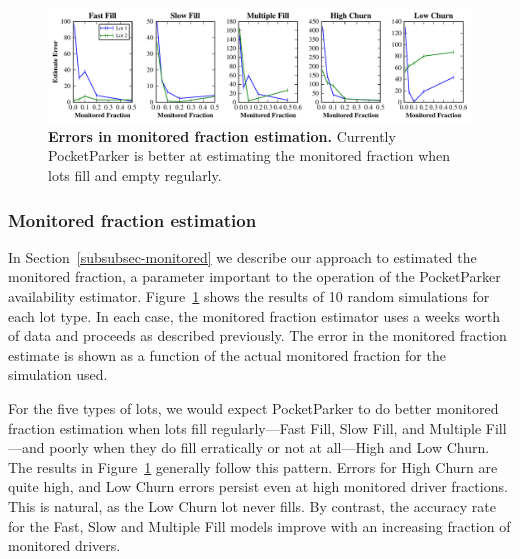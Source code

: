 \begin{figure}
\centering
\includegraphics[width=\textwidth]{./simulator/figures/capacity_experiment.pdf}

\caption{\textbf{Errors in monitored fraction estimation.} Currently
PocketParker is better at estimating the monitored fraction when lots fill
and empty regularly.}

\label{fig-capacityerrors}
\end{figure}

\subsubsection{Monitored fraction estimation}

In Section~\ref{subsubsec-monitored} we describe our approach to estimated
the monitored fraction, a parameter important to the operation of the
PocketParker availability estimator. Figure~\ref{fig-capacityerrors} shows
the results of 10 random simulations for each lot type. In each case, the
monitored fraction estimator uses a weeks worth of data and proceeds as
described previously. The error in the monitored fraction estimate is shown
as a function of the actual monitored fraction for the simulation used.

For the five types of lots, we would expect PocketParker to do better
monitored fraction estimation when lots fill regularly---Fast Fill, Slow
Fill, and Multiple Fill---and poorly when they do fill erratically or not at
all---High and Low Churn. The results in Figure~\ref{fig-capacityerrors}
generally follow this pattern. Errors for High Churn are quite high, and Low
Churn errors persist even at high monitored driver fractions. This is
natural, as the Low Churn lot never fills.  By contrast, the accuracy rate for
the Fast, Slow and Multiple Fill models improve with an increasing fraction of
monitored drivers.


